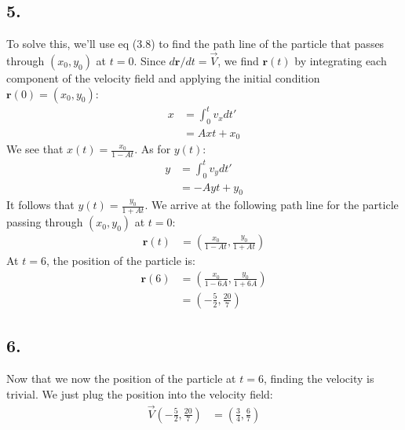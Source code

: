 \documentclass[a4paper, 12pt]{article}
\begin{document}
\subsection*{5.}
To solve this, we'll use eq (3.8) to find the path line of the particle that passes through $(x_0,y_0)$ at $t=0$. Since $d\mathbf{r}/dt = \vec{V}$, we find $\mathbf{r}(t)$ by integrating each component of the velocity field and applying the initial condition $\mathbf{r}(0) = (x_0, y_0)$:
\begin{align*}
	x &= \int_0^t v_x dt' \\
	&= A x t + x_0
\end{align*}
We see that $x(t) = \frac{x_0}{1- A t}$. As for $y(t)$:
\begin{align*}
	y &= \int_0^t v_y dt' \\
	&= - A y t + y_0
\end{align*}
It follows that $y(t) = \frac{y_0}{1 + A t}$. We arrive at the following path line for the particle passing through $(x_0, y_0)$ at $t=0$:
\begin{align*}
	\mathbf{r}(t) &= \left( \frac{x_0}{1 - A t}, \frac{y_0}{1 + A t} \right)
\end{align*}
At $t=6$, the position of the particle is:
\begin{align*}
	\mathbf{r}(6) &= \left( \frac{x_0}{1 - 6A}, \frac{y_0}{1 + 6A} \right) \\
	&= \left( -\frac{5}{2}, \frac{20}{7}\right)
\end{align*}

\subsection*{6.}
Now that we now the position of the particle at $t=6$, finding the velocity is trivial. We just plug the position into the velocity field:
\begin{align*}
	\vec{V}\left( -\frac{5}{2}, \frac{20}{7}\right) &= \left(\frac{3}{4}, \frac{6}{7}\right)
\end{align*}
\end{document}
